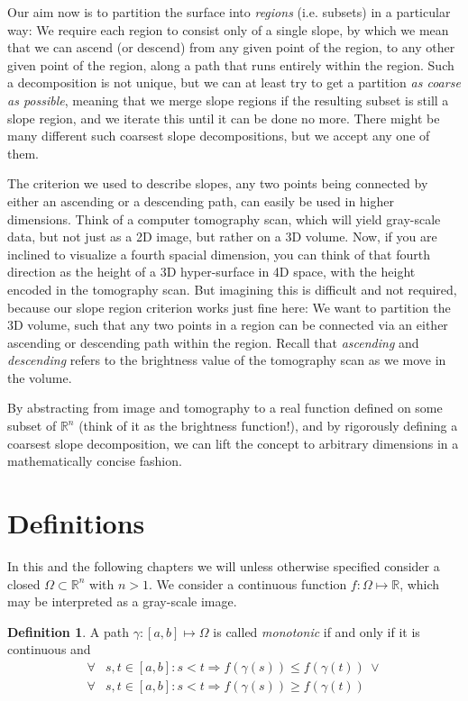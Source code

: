 \documentclass[a4paper,12pt]{paper}
\theoremstyle{plain}
\theoremstyle{definition}
\newtheorem{defn}[thm]{Definition} %
\begin{document}
Our aim now is to partition the surface into \emph{regions} (i.e. subsets) in a particular way: We require each region to consist only of a single slope, by which we mean that we can ascend (or descend) from any given point of the region, to any other given point of the region, along a path that runs entirely within the region. Such a decomposition is not unique, but we can at least try to get a partition \emph{as coarse as possible}, meaning that we merge slope regions if the resulting subset is still a slope region, and we iterate this until it can be done no more. There might be many different such coarsest slope decompositions, but we accept any one of them.

The criterion we used to describe slopes, any two points being connected by either an ascending or a descending path, can easily be used in higher dimensions. Think of a computer tomography scan, which will yield gray-scale data, but not just as a 2D image, but rather on a 3D volume.
Now, if you are inclined to visualize a fourth spacial dimension, you can think of that fourth direction as the height of a 3D hyper-surface in 4D space, with the height encoded in the tomography scan. But imagining this is difficult and not required, because our slope region criterion works just fine here: We want to partition the 3D volume, such that any two points in a region can be connected via an either ascending or descending path within the region. Recall that \emph{ascending} and \emph{descending} refers to the brightness value of the tomography scan as we move in the volume.

By abstracting from image and tomography to a real function defined on some subset of $\mathbb{R}^n$ (think of it as the brightness function!), and by rigorously defining a coarsest slope decomposition, we can lift the concept to arbitrary dimensions in a mathematically concise fashion.

\section{Definitions}

In this and the following chapters we will unless otherwise specified consider a closed $\Omega \subset \mathbb{R}^n$ with $n > 1$. We consider a continuous function $f: \Omega \mapsto \mathbb{R}$, which may be interpreted as a gray-scale image.

\begin{defn}
A path $\gamma: [a,b] \mapsto \Omega$ is called \emph{monotonic} if and only if it is continuous and
\begin{align*}
\forall & s, t \in [a,b]: s < t \Rightarrow f(\gamma(s)) \leq f(\gamma(t)) ~ \lor \\
\forall & s, t \in [a,b]: s < t \Rightarrow f(\gamma(s)) \geq f(\gamma(t))
\end{align*}
\end{defn}
\end{document}
